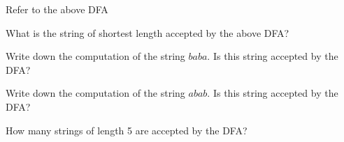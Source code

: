   Refer to the above DFA
  \begin{tightlist}
  \item What is the string of shortest length accepted by the above DFA?
  \item  Write down the computation of the string $baba$.
    Is this string accepted by the DFA?
  \item Write down the computation of the string $abab$.
    Is this string accepted by the DFA?
  \item How many strings of length 5 are accepted by the DFA?
  \end{tightlist}
